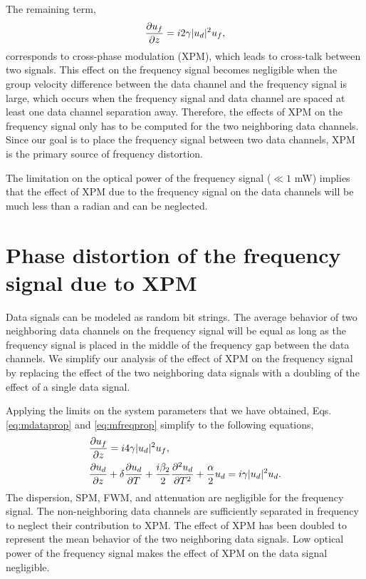 The remaining term,
\begin{equation}
\frac{\partial u_f}{\partial z} = i2\gamma|u_d|^2u_f,
\end{equation}
corresponds to cross-phase modulation (XPM), which leads to cross-talk between two signals. This effect on the frequency signal becomes negligible when the group velocity difference between the data channel and the frequency signal is large, which occurs when the frequency signal and data channel are spaced at least one data channel separation away. Therefore, the effects of XPM on the frequency signal only has to be computed for the two neighboring data channels. Since our goal is to place the frequency signal between two data channels, XPM is the primary source of frequency distortion. 

The limitation on the optical power of the frequency signal ($\ll 1$ mW) implies that the effect of XPM due to the frequency signal on the data channels will be much less than a radian and can be neglected.

\section{Phase distortion of the frequency signal due to XPM} \label{sec:noisexpm}

Data signals can be modeled as random bit strings. The average behavior of two neighboring data channels on the frequency signal will be equal as long as the frequency signal is placed in the middle of the frequency gap between the data channels. We simplify our analysis of the effect of XPM on the frequency signal by replacing the effect of the two neighboring data signals with a doubling of the effect of a single data signal.

Applying the limits on the system parameters that we have obtained, Eqs. \ref{eq:mdataprop} and \ref{eq:mfreqprop} simplify to the following equations,
%
\begin{subequations}
\begin{align}
\label{eq:simpledfreq}
&\frac{\partial u_f}{\partial z} = i4\gamma|u_d|^2u_f, \\
\label{eq:simpleddata}
&\frac{\partial u_d}{\partial z} + \delta\frac{\partial u_d}{\partial T} + \frac{i\beta_{2}}{2}\frac{\partial ^2u_d}{\partial T^2} + \frac{\alpha}{2}u_d = i\gamma|u_d|^2u_d.
\end{align}
\end{subequations}
%
The dispersion, SPM, FWM, and attenuation are negligible for the frequency signal. The non-neighboring data channels are sufficiently separated in frequency to neglect their contribution to XPM. The effect of XPM has been doubled to represent the mean behavior of the two neighboring data signals. Low optical power of the frequency signal makes the effect of XPM on the data signal negligible. 

